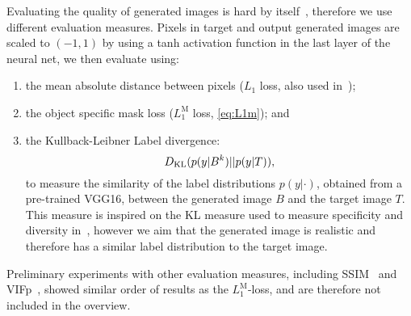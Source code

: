 \documentclass[runningheads]{llncs}
\def\wmad{$L_1^{\textrm{M}}$\xspace}
\begin{document}
Evaluating the quality of generated images is hard by itself~\cite{wang2002image,salimans16nips}, therefore we use different evaluation measures.
Pixels in target and output generated images are scaled to $(-1,1)$ by using a tanh activation function in the last layer of the neural net, we then evaluate using:
\begin{enumerate}
	\item the mean absolute distance between pixels ($L_1$ loss, also used in~\cite{pix2pix2016});
	\item the object specific mask loss (\wmad loss, \autoref{eq:L1m}); and
	\item the Kullback-Leibner Label divergence:
		\vspace{-2mm}\begin{equation}D_{\textrm{KL}}(p(y|B^k) || p(y|T)),\vspace{-2mm}\end{equation}
		to measure the similarity of the label distributions $p(y|\cdot)$, obtained from a pre-trained VGG16, between the generated image $B$ and the target image $T$. 
		This measure is inspired on the KL measure used to measure specificity and diversity in~\cite{salimans16nips}, however we aim that the generated image is realistic and therefore has a similar label distribution to the target image.
\end{enumerate}
Preliminary experiments with other evaluation measures, including SSIM~\cite{wang2004image} and VIFp~\cite{sheikh2006image}, showed similar order of results as the \wmad-loss, and are therefore not included in the overview.
\end{document}
